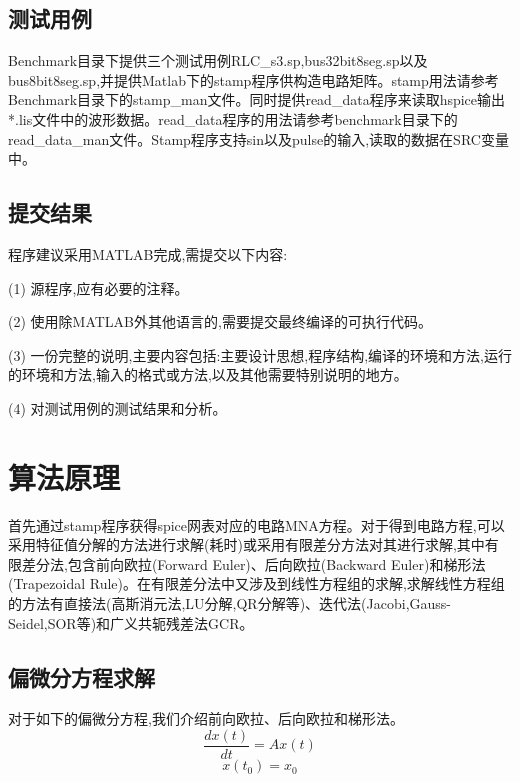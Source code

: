 \documentclass[12pt]{article}
\begin{document}
\begin{sloppypar}
\subsection{测试用例}
\qquad Benchmark目录下提供三个测试用例RLC\_s3.sp,bus32bit8seg.sp以及bus8bit8seg.sp,并提供Matlab下的stamp程序供构造电路矩阵。stamp用法请参考Benchmark目录下的stamp\_man文件。同时提供read\_data程序来读取hspice输出*.lis文件中的波形数据。read\_data程序的用法请参考benchmark目录下的read\_data\_man文件。Stamp程序支持sin以及pulse的输入,读取的数据在SRC变量中。\par

\subsection{提交结果}
\qquad 程序建议采用MATLAB完成,需提交以下内容: \par
\qquad (1) 源程序,应有必要的注释。 \par
\qquad (2) 使用除MATLAB外其他语言的,需要提交最终编译的可执行代码。 \par
\qquad (3) 一份完整的说明,主要内容包括:主要设计思想,程序结构,编译的环境和方法,运行的环境和方法,输入的格式或方法,以及其他需要特别说明的地方。 \par
\qquad (4) 对测试用例的测试结果和分析。 \par



\section{算法原理}

\qquad 首先通过stamp程序获得spice网表对应的电路MNA方程。对于得到电路方程,可以采用特征值分解的方法进行求解(耗时)或采用有限差分方法对其进行求解,其中有限差分法,包含前向欧拉(Forward Euler)、后向欧拉(Backward Euler)和梯形法(Trapezoidal Rule)。在有限差分法中又涉及到线性方程组的求解,求解线性方程组的方法有直接法(高斯消元法,LU分解,QR分解等)、迭代法(Jacobi,Gauss-Seidel,SOR等)和广义共轭残差法GCR。\par

\subsection{偏微分方程求解}
对于如下的偏微分方程,我们介绍前向欧拉、后向欧拉和梯形法。
\begin{equation}
  \frac{dx(t)}{dt}=Ax(t) 
\end{equation}
\begin{equation}
  x(t_0) = x_0
\end{equation}


\end{sloppypar}
\end{document}
